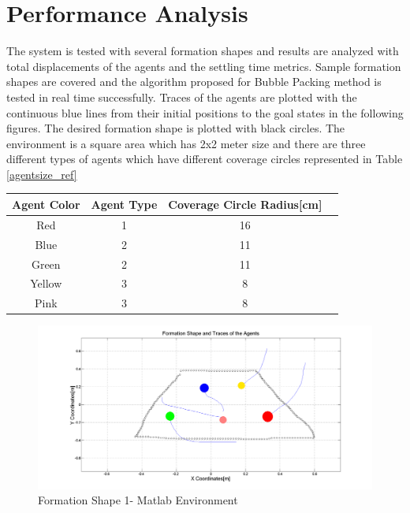\section{Performance Analysis}
The system is tested with several formation shapes and results are analyzed with total displacements of the agents and the settling time metrics. Sample formation shapes are covered  and the algorithm proposed for Bubble Packing method is tested in real time successfully.  Traces of the agents are plotted with the continuous blue lines from their initial positions to the goal states in the following figures. The desired formation shape is plotted with black circles. The environment is a square area which has 2x2 meter size and there are three different types of agents which have different coverage circles represented in Table \ref{agentsize_ref}

\begin{center}
 \label{agentsize_ref} 
\begin{tabular}{|c| c |c |c ||}
\hline
\textbf{Agent Color}  & \textbf{Agent Type} & \textbf{Coverage Circle Radius[cm]}\\ 
\hline
Red & 1 & 16 \\
Blue & 2 & 11 \\
Green & 2 & 11 \\
Yellow & 3 & 8 \\
Pink & 3 & 8 \\
\hline
\end{tabular}
\end{center}
		
\begin{figure}[H]
\caption{Formation Shape 1- Matlab Environment}
\centerline{\includegraphics[scale = 0.32]{2_hardware}}
\end{figure} 
			
